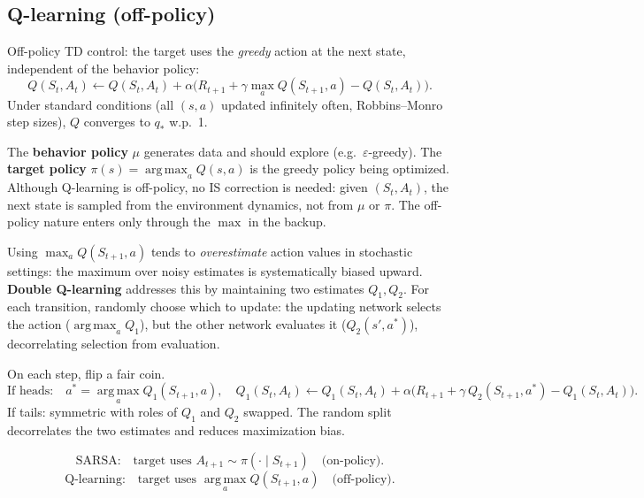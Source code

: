 \documentclass[11pt, oneside]{book}
\newcommand{\argmax}{\operatorname*{arg\,max}}
\newcommand{\qstar}{q_{*}}            %
\begin{document}
\subsection{Q-learning (off-policy)}

\begin{thmbox}[title={Q-Learning}]
Off-policy TD control: the target uses the \emph{greedy} action at the next
state, independent of the behavior policy:
\[
  Q(S_t,A_t) \leftarrow Q(S_t,A_t)
    + \alpha\bigl(R_{t+1} + \gamma\max_{a}Q(S_{t+1},a) - Q(S_t,A_t)\bigr).
\]
Under standard conditions (all $(s,a)$ updated infinitely often, Robbins--Monro
step sizes), $Q$ converges to $\qstar$ w.p.\ 1.
\end{thmbox}

The \textbf{behavior policy} $\mu$ generates data and should explore (e.g.\
$\varepsilon$-greedy). The \textbf{target policy} $\pi(s)=\argmax_a Q(s,a)$
is the greedy policy being optimized. Although Q-learning is off-policy, no IS
correction is needed: given $(S_t, A_t)$, the next state is sampled from the
environment dynamics, not from $\mu$ or $\pi$. The off-policy nature enters
only through the $\max$ in the backup.

\begin{notebox}[title={Maximization Bias}]
Using $\max_a Q(S_{t+1},a)$ tends to \emph{overestimate} action values in
stochastic settings: the maximum over noisy estimates is systematically
biased upward. \textbf{Double Q-learning} addresses this by maintaining two
estimates $Q_1, Q_2$. For each transition, randomly choose which to update:
the updating network selects the action ($\argmax_a Q_1$), but the other
network evaluates it ($Q_2(s',a^*)$), decorrelating selection from
evaluation.
\end{notebox}

\begin{thmbox}[title={Double Q-Learning}]
On each step, flip a fair coin.
\[
  \text{If heads:} \quad a^* = \argmax_a Q_1(S_{t+1},a), \quad
  Q_1(S_t,A_t) \leftarrow Q_1(S_t,A_t)
    + \alpha\bigl(R_{t+1} + \gamma\,Q_2(S_{t+1},a^*) - Q_1(S_t,A_t)\bigr).
\]
If tails: symmetric with roles of $Q_1$ and $Q_2$ swapped.
The random split decorrelates the two estimates and reduces maximization bias.
\end{thmbox}

\begin{intbox}[title={On-Policy vs.\ Off-Policy in One Line}]
\[
  \text{SARSA:}\quad\text{target uses } A_{t+1} \sim \pi(\cdot\mid S_{t+1})
    \quad\text{(on-policy)}.
\]
\[
  \text{Q-learning:}\quad\text{target uses } \argmax_a Q(S_{t+1},a)
    \quad\text{(off-policy)}.
\]
\end{intbox}
\end{document}
